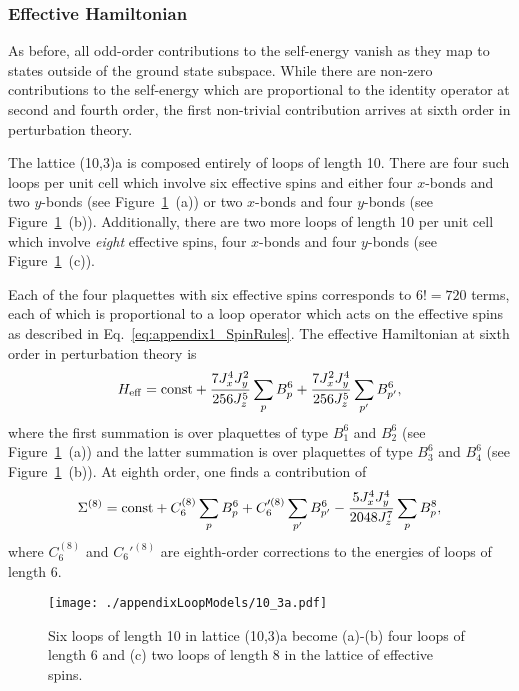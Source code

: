 \subsubsection{Effective Hamiltonian}
%
%
As before, all odd-order contributions to the self-energy vanish as they map to states outside of the ground state subspace.
While there are non-zero contributions to the self-energy which are proportional to the identity operator at second and fourth order, the first non-trivial contribution arrives at sixth order in perturbation theory.

The lattice (10,3)a is composed entirely of loops of length 10.
There are four such loops per unit cell which involve six effective spins and either four $x$-bonds and two $y$-bonds (see Figure~\ref{fig:appendix1_10_3a}~(a)) or two $x$-bonds and four $y$-bonds (see Figure~\ref{fig:appendix1_10_3a}~(b)).
Additionally, there are two more loops of length 10 per unit cell which involve \textit{eight} effective spins, four $x$-bonds and four $y$-bonds (see Figure~\ref{fig:appendix1_10_3a}~(c)).

Each of the four plaquettes with six effective spins corresponds to $6! = 720$ terms, each of which is proportional to a loop operator which acts on the effective spins as described in Eq.~\eqref{eq:appendix1_SpinRules}.
The effective Hamiltonian at sixth order in perturbation theory is
%
\begin{equation}
	H_{\rm eff} = {\rm const} + \frac{7 J_x^4 J_y^2}{256 J_z^5} \sum_{p} B^6_p + \frac{7 J_x^2 J_y^4}{256 J_z^5} \sum_{p'} B_{p'}^6,
	\label{eq:10_3a_Heff}
\end{equation}
%
where the first summation is over plaquettes of type $B_1^6$ and $B_2^6$ (see Figure~\ref{fig:appendix1_10_3a}~(a)) and the latter summation is over plaquettes of type $B_3^6$ and $B_4^6$ (see Figure~\ref{fig:appendix1_10_3a}~(b)).
At eighth order, one finds a contribution of
%
\begin{equation}
	\Sigma^{(8)} = {\rm const} + C_6^{(8)} \sum_p B_p^6 + C_6'^{(8)} \sum_{p'} B_{p'}^6 - \frac{5 J_x^4 J_y^4}{2048 J_z^7} \sum_p B_p^8,
	\label{eq:10_3a_SE8}
\end{equation}
%
where $C_6^{(8)}$ and $C_6'^{(8)}$ are eighth-order corrections to the energies of loops of length 6.
%
\begin{figure}[tb]
	\centering
	\texttt{[image: ./appendixLoopModels/10\_3a.pdf]}
	\caption{Six loops of length 10 in lattice (10,3)a become (a)-(b) four loops of length 6 and (c) two loops of length 8 in the lattice of effective spins.}
	\label{fig:appendix1_10_3a}
\end{figure}
%


